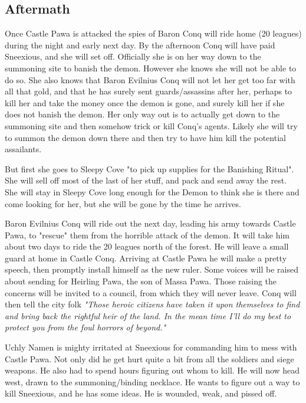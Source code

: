 \documentclass[11pt, twoside, titlepage, a4paper]{report}
\begin{document}
\subsection*{Aftermath}
Once Castle Pawa is attacked the spies of Baron Conq will ride home (20 leagues) during the night and early next day. By the afternoon Conq will have paid Sneexious, and she will set off. Officially she is on her way down to the summoning site to banish the demon. However she knows she will not be able to do so. She also knows that Baron Evilnius Conq will not let her get too far with all that gold, and that he has surely sent guards/assassins after her, perhaps to kill her and take the money once the demon is gone, and surely kill her if she does not banish the demon. Her only way out is to actually get down to the summoning site and then somehow trick or kill Conq's agents. Likely she will try to summon the demon down there and then try to have him kill the potential assailants.

But first she goes to Sleepy Cove "to pick up supplies for the Banishing Ritual". She will sell off most of the last of her stuff, and pack and send away the rest. She will stay in Sleepy Cove long enough for the Demon to think she is there and come looking for her, but she will be gone by the time he arrives.

Baron Evilnius Conq will ride out the next day, leading his army towards Castle Pawa, to "rescue" them from the horrible attack of the demon. It will take him about two days to ride the 20 leagues north of the forest. He will leave a small guard at home in Castle Conq. Arriving at Castle Pawa he will make a pretty speech, then promptly install himself as the new ruler. Some voices will be raised about sending for Heirling Pawa, the son of Massa Pawa. Those raising the concerns will be invited to a council, from which they will never leave. Conq will then tell the city folk \emph{"Those heroic citizens have taken it upon themselves to find and bring back the rightful heir of the land. In the mean time I'll do my best to protect you from the foul horrors of beyond."}

Uchly Namen is mighty irritated at Sneexious for commanding him to mess with Castle Pawa. Not only did he get hurt quite a bit from all the soldiers and siege weapons. He also had to spend hours figuring out whom to kill.
He will now head west, drawn to the summoning/binding necklace. He wants to figure out a way to kill Sneexious, and he has some ideas. He is wounded, weak, and pissed off.
\end{document}

